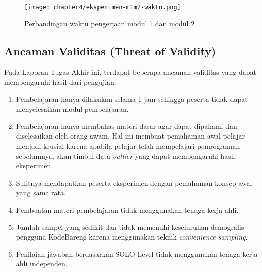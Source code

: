 \begin{figure}[H]
  \centering
  \texttt{[image: chapter4/eksperimen-m1m2-waktu.png]}
  \caption{Perbandingan waktu pengerjaan modul 1 dan modul 2} \label{fig:eksperimen-m1m2-waktu}
\end{figure}

\subsection{Ancaman Validitas (Threat of Validity)}

Pada Laporan Tugas Akhir ini, terdapat beberapa ancaman validitas yang dapat mempengaruhi hasil dari pengujian:
\begin{enumerate}
  \item Pembelajaran hanya dilakukan selama 1 jam sehingga peserta tidak dapat menyelesaikan modul pembelajaran.
  \item Pembelajaran hanya membahas materi dasar agar dapat dipahami dan diselesaikan oleh orang awam. Hal ini membuat pemahaman awal pelajar menjadi krusial karena apabila pelajar telah mempelajari pemrograman sebelumnya, akan timbul data \textit{outlier} yang dapat mempengaruhi hasil eksperimen.
  \item Sulitnya mendapatkan peserta eksperimen dengan pemahaman konsep awal yang sama rata.
  \item Pembuatan materi pembelajaran tidak menggunakan tenaga kerja ahli.
  \item Jumlah sampel yang sedikit dan tidak memenuhi keseluruhan demografis pengguna KodeBareng karena menggunakan teknik \textit{convenience sampling}.
  \item Penilaian jawaban berdasarkan SOLO Level tidak menggunakan tenaga kerja ahli independen.
\end{enumerate}